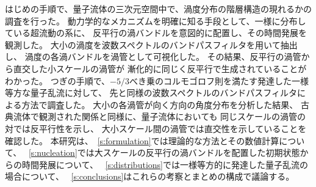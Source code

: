 \documentclass[12pt,a4paper]{jbook}
\begin{document}
		はじめの手順で、量子流体の三次元空間中で、渦度分布の階層構造の現れるかの調査を行った。
		動力学的なメカニズムを明確に知る手段として、一様に分布している超流動の系に、
		反平行の渦バンドルを意図的に配置し、その時間発展を観測した。
		大小の渦度を波数スペクトルのバンドパスフィルタを用いて抽出し、
        渦度の各渦バンドルを渦管として可視化した。
		その結果、反平行の渦管から直交した小スケールの渦管が
		漸化的に同じく反平行で生成されていることがわかった。
		つぎの手順で、$-5/3$べき乗のコルモゴロフ則を満たす発達した一様等方な量子乱流に対して、
		先と同様の波数スペクトルのバンドパスフィルタによる方法で調査した。
		大小の各渦管が向く方向の角度分布を分析した結果、
		古典流体で観測された関係と同様に、量子流体においても
		同じスケールの渦管の対では反平行性を示し、
		大小スケール間の渦管では直交性を示していることを確認した。
		本研究は、~\ref{s:formulation}では理論的な方法とその数値計算について、
		~\ref{s:nucleation}では大スケールの反平行の渦バンドルを配置した初期状態からの時間発展について、
		~\ref{s:distributions}では一様等方的に発達した量子乱流の場合について、
		~\ref{s:conclusions}はこれらの考察とまとめの構成で議論する。
\end{document}
